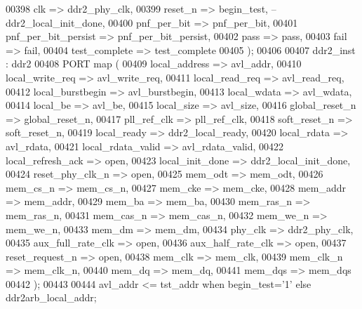 \begin{DoxyCode}
00398         clk                     => ddr2_phy_clk,
00399         reset\_n                 => begin_test,\textcolor{keyword}{ --ddr2\_local\_init\_done,}
00400         pnf\_per\_bit             => pnf_per_bit,
00401         pnf\_per\_bit\_persist => pnf_per_bit_persist,
00402         pass                        => pass,
00403         fail                        => fail,
00404         test\_complete           => test_complete 
00405     \textcolor{vhdlchar}{)};  
00406 
00407 ddr2_inst : ddr2
00408     \textcolor{keywordflow}{PORT} \textcolor{keywordflow}{map} (
00409         local_address       => avl_addr, 
00410         local_write_req => avl_write_req, 
00411         local_read_req      => avl_read_req, 
00412         local_burstbegin    => avl_burstbegin, 
00413         local_wdata         => avl_wdata, 
00414         local_be                => avl_be, 
00415         local_size          => avl_size, 
00416         global_reset_n      => global_reset_n, 
00417         pll_ref_clk         => pll_ref_clk, 
00418         soft_reset_n        => soft_reset_n, 
00419         local_ready         => ddr2_local_ready, 
00420         local_rdata         => avl_rdata, 
00421         local_rdata_valid   => avl_rdata_valid, 
00422         local_refresh_ack   => \textcolor{keywordflow}{open}, 
00423         local_init_done => ddr2_local_init_done, 
00424         reset_phy_clk_n => \textcolor{keywordflow}{open}, 
00425         mem_odt             => mem_odt, 
00426         mem_cs_n                => mem_cs_n, 
00427         mem_cke             => mem_cke, 
00428         mem_addr                => mem_addr, 
00429         mem_ba              => mem_ba, 
00430         mem_ras_n           => mem_ras_n, 
00431         mem_cas_n           => mem_cas_n, 
00432         mem_we_n                => mem_we_n, 
00433         mem_dm              => mem_dm, 
00434         phy_clk             => ddr2_phy_clk, 
00435         aux_full_rate_clk   => \textcolor{keywordflow}{open}, 
00436         aux_half_rate_clk   => \textcolor{keywordflow}{open}, 
00437         reset_request_n => \textcolor{keywordflow}{open}, 
00438         mem_clk             => mem_clk, 
00439         mem_clk_n           => mem_clk_n, 
00440         mem_dq              => mem_dq, 
00441         mem_dqs             => mem_dqs 
00442     \textcolor{vhdlchar}{)};
00443 
00444 \textcolor{vhdlchar}{avl_addr}        \textcolor{vhdlchar}{<=} \textcolor{vhdlchar}{tst_addr}         \textcolor{keywordflow}{when} \textcolor{vhdlchar}{begin_test}\textcolor{vhdlchar}{=}\textcolor{vhdlchar}{'}\textcolor{vhdllogic}{}\textcolor{vhdllogic}{1}\textcolor{vhdlchar}{'} \textcolor{keywordflow}{else} \textcolor{vhdlchar}{ddr2arb_local_addr};

\end{DoxyCode}
